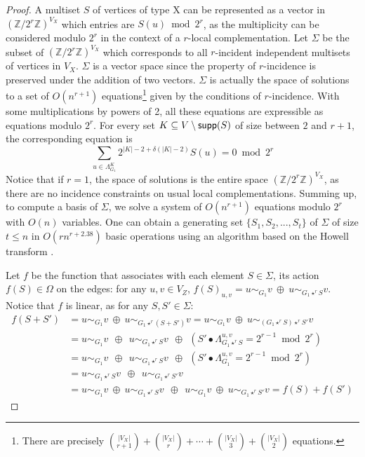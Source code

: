 \documentclass[a4paper,UKenglish,cleveref,autoref,thm-restate]{arxiv}
\newcommand{\ls}{\leqslant}
\newcommand{\Zp}[1]{\mathbb{Z}/#1\mathbb{Z}}
\newcommand{\supp}{\textup{\textsf{supp}}}
\begin{document}
\begin{proof}
    A multiset $S$ of vertices of type X can be represented as a vector in $({\Zp{2^r}})^{V_X}$ which entries are $S(u) \bmod 2^{r}$, as the multiplicity can be considered modulo $2^r$ in the context of a $r$-local complementation. Let $\Sigma$ be the subset of $({\Zp{2^r}})^{V_X}$ which corresponds to all $r$-incident independent multisets of vertices in $V_X$. $\Sigma$ is a vector space since the property of $r$-incidence is preserved under the addition of two vectors. $\Sigma$ is actually the space of solutions to a set of $O(n^{r+1})$ equations\footnote{There are precisely $\binom{|V_X|}{r+1}+\binom{|V_X|}{r}+\cdots+\binom{|V_X|}{3}+\binom{|V_X|}{2}$ equations.} given by the conditions of $r$-incidence. With some multiplications by powers of 2, all these equations are expressible as equations modulo $2^{r}$. For every set  $K\subseteq V\setminus \supp(S)$ of size between $2$ and $r+1$, the corresponding equation is $$\sum_{u \in \Lambda_{G_1}^K}2^{|K|-2+\delta(|K|-2)}S(u) = 0\bmod 2^{r}$$
    Notice that if $r=1$, the space of solutions is the entire space $({\Zp{2^r}})^{V_X}$, as there are no incidence constraints on usual local complementations. Summing up, to compute a basis of $\Sigma$, we solve a system of $O(n^{r+1})$ equations modulo $2^{r}$ with $O(n)$ variables. One can obtain a generating set $\{S_1,S_2,...,S_t\}$ of $\Sigma$ of size $t \ls n$ in $O(r n^{r+2.38})$ basic operations using an algorithm based on the Howell transform \cite{storjohann2000algorithms}. 

    Let $f$ be the function that associates with each element $S \in \Sigma$, its action $f(S) \in \Omega$ on the edges: for any $u,v \in V_Z$, $f(S)_{u,v} = u\sim_{G_1} v ~\oplus~ u\sim_{G_1\star^r S} v$. Notice that $f$ is linear, as for any $S, S' \in \Sigma$:
    \begin{align*}
        f(S+S') &= u\sim_{G_1} v ~\oplus~ u\sim_{G_1\star^r (S+S')} v
        = u\sim_{G_1} v ~\oplus~ u\sim_{(G_1\star^r S) \star^r S'} v\\
        &= u\sim_{G_1} v ~~\oplus~~ u\sim_{G_1\star^r S} v ~~\oplus~~ \left(S' \bullet\Lambda_{G_1\star^r S}^{u,v} = 2^{r-1}\bmod 2^{r}\right)\\
        &= u\sim_{G_1} v ~~\oplus~~ u\sim_{G_1\star^r S} v ~~\oplus~~ \left(S' \bullet\Lambda_{G_1}^{u,v} = 2^{r-1}\bmod 2^{r}\right)\\
        &= u\sim_{G_1 \star^r S} v ~~\oplus~~ u\sim_{G_1\star^r S'} v\\
        &= u\sim_{G_1} v ~\oplus~ u\sim_{G_1 \star^r S} v ~~\oplus~~ u\sim_{G_1} v ~\oplus~ u\sim_{G_1\star^r S'} v = f(S)+f(S')
    \end{align*} 


\end{proof}
\end{document}
